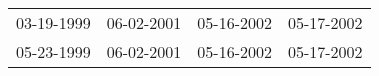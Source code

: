 \begin{supertabular}{llll}
 03-19-1999 &  06-02-2001 &  05-16-2002 &  05-17-2002 \\
 05-23-1999 &  06-02-2001 &  05-16-2002 &  05-17-2002 \\
\end{supertabular}
